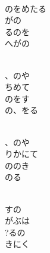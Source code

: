 \documentclass[10pt,b5j]{tarticle} %
\begin{document}
\vspace{1.5em} %
\newcommand{\linespace}{0.5em} %
\newcommand{\blocksize}{0.5\hsize} %
\newcommand{\itemmargin}{6em} %
\begin{enumerate} %
    \setlength{\itemindent}{\itemmargin} %
    \begin{minipage}[c]{\blocksize}
    
        \vspace{\linespace}
        \item~\\
        のをめたる\\
        がの\\
        るのを\\
        へがの
        
        \vspace{\linespace}
        \item~\\
        、のや\\
        ちめて\\
        のをす\\
        の、をる
        
        \vspace{\linespace}
        \item~\\
        、のや\\
        りかにて\\
        ののき\\
        のる
        
        \vspace{\linespace}
        \item~\\
        すの\\
        がぶは\\
        ?るの\\
        きにく
        

\end{minipage}
\end{enumerate}
\end{document}
